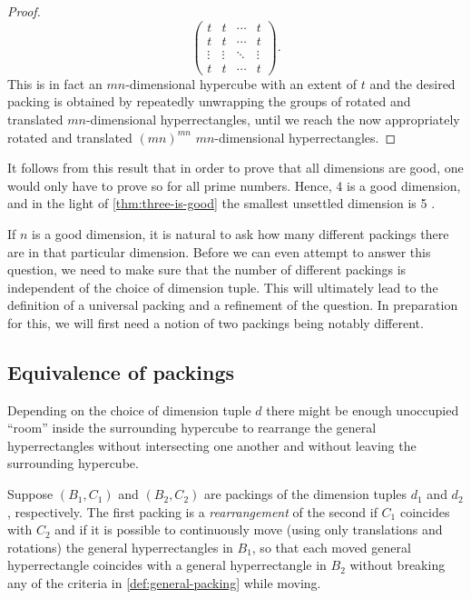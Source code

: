 \begin{proof}
\[
\begin{pmatrix}
t      & t      & \cdots & t      \\
t      & t      & \cdots & t      \\
\vdots & \vdots & \ddots & \vdots \\
t      & t      & \cdots & t
\end{pmatrix}.
\]
This is in fact an $mn$-dimensional hypercube with an extent of $t$ and the desired packing is obtained by repeatedly unwrapping the groups of rotated and translated $mn$-dimensional hyperrectangles, until we reach the now appropriately rotated and translated $(mn)^{mn}$ $mn$-dimensional hyperrectangles.
\end{proof}

\noindent It follows from this result that in order to prove that all dimensions are good, one would only have to prove so for all prime numbers. Hence, 4 is a good dimension, and in the light of \cref{thm:three-is-good} the smallest unsettled dimension is 5 \cite[p. 223]{Hoffman1981}\cite[p. 914]{berlekamp_conway_guy_2004}.

If $n$ is a good dimension, it is natural to ask how many different packings there are in that particular dimension. Before we can even attempt to answer this question, we need to make sure that the number of different packings is independent of the choice of dimension tuple. This will ultimately lead to the definition of a universal packing and a refinement of the question. In preparation for this, we will first need a notion of two packings being notably different.

\subsection{Equivalence of packings}
Depending on the choice of dimension tuple $d$ there might be enough unoccupied ``room'' inside the surrounding hypercube to rearrange the general hyperrectangles without intersecting one another and without leaving the surrounding hypercube.

\begin{definition}[Rearrangement]
Suppose $(B_1, C_1)$ and $(B_2, C_2)$ are packings of the dimension tuples $d_1$ and $d_2$, respectively. The first packing is a \textit{rearrangement} of the second if $C_1$ coincides with $C_2$ and if it is possible to continuously move (using only translations and rotations) the general hyperrectangles in $B_1$, so that each moved general hyperrectangle coincides with a general hyperrectangle in $B_2$ without breaking any of the criteria in \cref{def:general-packing} while moving.
\end{definition}

